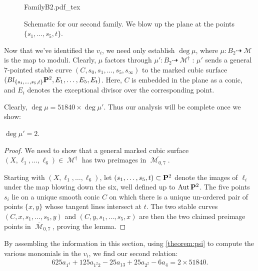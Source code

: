 \documentclass[12pt,reqno]{amsart}
\newcommand{\incfig}[1]{%
    \def\svgwidth{\columnwidth}
    {#1.pdf_tex}
}
\DeclareMathOperator{\M}{\mathcal{M}}
\numberwithin{equation}{section}
\renewcommand {\o}[1]{\overline{#1}}
\begin{document}
\begin{figure}[!]
    \centering
   \incfig{FamilyB2}
    \caption{Schematic for our second family. We blow up the plane at
      the points $\{s_{1}, \dots, s_{5}, t\}$.}
    \label{fig:FamilyB2}
     \end{figure}


Now that we've identified the $v_{i}$, we need only establish
$\deg \mu$, where $\mu: B_{2} \dashrightarrow \M$ is the map to
moduli.  Clearly, $\mu$ factors through
$\mu':B_{2} \dashrightarrow \M^{\dagger}$: $\mu'$ sends a general
$7$-pointed stable curve $(C,s_0,s_1, \dots, s_5, s_{\infty})$ to the
marked cubic surface
$(Bl_{\{s_1, \dots, s_{5}, t\}}\P^{2}, E_1, \dots, E_5, E_t)$. Here,
$C$ is embedded in the plane as a conic, and $E_i$ denotes the
exceptional divisor over the corresponding point.

Clearly, $\deg \mu = 51840 \times \deg \mu'$.  Thus our analysis will
be complete once we show:

\begin{lemma}
  \label{lemma:muprime2} $\deg \mu' = 2.$
\end{lemma}

\begin{proof}
  We need to show that a general marked cubic surface
  $(X, \ell_{1}, \dots, \ell_{6}) \in \M^{\dagger}$ has two preimages
  in $\o{\M_{0,7}}$.
  
  
  Starting with $(X, \ell_{1}, \dots, \ell_{6})$, let
  $(s_1, \dots, s_5, t) \subset \P^{2}$ denote the images of
  $\ell_{i}$ under the map blowing down the six, well defined up to
  $\Aut \P^{2}$.  The five points $s_{i}$ lie on a unique smooth conic
  $C$ on which there is a unique un-ordered pair of points $\{x,y\}$
  whose tangent lines intersect at $t$.  The two stable curves
  $(C,x,s_1, \dots, s_5, y)$ and $(C,y,s_1, \dots, s_5, x)$ are then
  the two claimed preimage points in $\o{\M}_{0,7}$, proving the
  lemma.
\end{proof}


By assembling the information in this section, using
\autoref{theorem:psi} to compute the various monomials in the $v_{i}$,
we find our second relation:
\begin{align}
  \label{eq:relation2}
  625 a_{1^{4}} + 125 a_{1^{2}2} - 25a_{13} + 25a_{2^2} - 6 a_{4} = 2 \times 51840.
\end{align}

\end{document}
